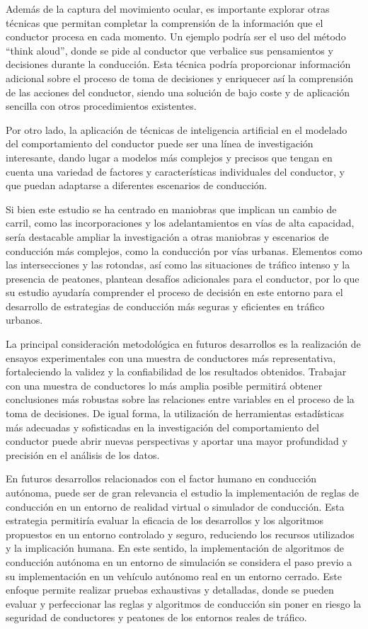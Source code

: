 Además de la captura del movimiento ocular, es importante explorar otras técnicas que permitan completar la comprensión de la información que el conductor procesa en cada momento. Un ejemplo podría ser el uso del método \enquote{think aloud}, donde se pide al conductor que verbalice sus pensamientos y decisiones durante la conducción. Esta técnica podría proporcionar información adicional sobre el proceso de toma de decisiones y enriquecer así la comprensión de las acciones del conductor, siendo una solución de bajo coste y de aplicación sencilla con otros procedimientos existentes. 

Por otro lado, la aplicación de técnicas de inteligencia artificial en el modelado del comportamiento del conductor puede ser una línea de investigación interesante, dando lugar a modelos más complejos y precisos que tengan en cuenta una variedad de factores y características individuales del conductor, y que puedan adaptarse a diferentes escenarios de conducción. 

Si bien este estudio se ha centrado en maniobras que implican un cambio de carril, como las incorporaciones y los adelantamientos en vías de alta capacidad, sería destacable ampliar la investigación a otras maniobras y escenarios de conducción más complejos, como la conducción por vías urbanas. Elementos como las intersecciones y las rotondas, así como las situaciones de tráfico intenso y la presencia de peatones, plantean desafíos adicionales para el conductor, por lo que su estudio ayudaría comprender el proceso de decisión en este entorno para el desarrollo de estrategias de conducción más seguras y eficientes en tráfico urbanos. 

La principal consideración metodológica en futuros desarrollos es la realización de ensayos experimentales con una muestra de conductores más representativa, fortaleciendo la validez y la confiabilidad de los resultados obtenidos. Trabajar con una muestra de conductores lo más amplia posible permitirá obtener conclusiones más robustas sobre las relaciones entre variables en el proceso de la toma de decisiones. De igual forma, la utilización de herramientas estadísticas más adecuadas y sofisticadas en la investigación del comportamiento del conductor puede abrir nuevas perspectivas y aportar una mayor profundidad y precisión en el análisis de los datos.  

En futuros desarrollos relacionados con el factor humano en conducción autónoma, puede ser de gran relevancia el estudio la implementación de reglas de conducción en un entorno de realidad virtual o simulador de conducción. Esta estrategia permitiría evaluar la eficacia de los desarrollos y los algoritmos propuestos en un entorno controlado y seguro, reduciendo los recursos utilizados y la implicación humana. En este sentido, la implementación de algoritmos de conducción autónoma en un entorno de simulación se considera el paso previo a su implementación en un vehículo autónomo real en un entorno cerrado. Este enfoque permite realizar pruebas exhaustivas y detalladas, donde se pueden evaluar y perfeccionar las reglas y algoritmos de conducción sin poner en riesgo la seguridad de conductores y peatones de los entornos reales de tráfico. 


